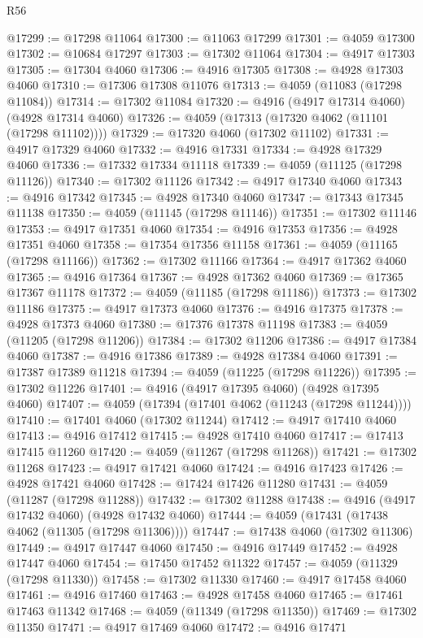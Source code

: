 \begin{lexlean}{R56}
\begin{coremodule}
@17299 := @17298 @11064
@17300 := @11063 @17299
@17301 := @4059 @17300
@17302 := @10684 @17297
@17303 := @17302 @11064
@17304 := @4917 @17303
@17305 := @17304 @4060
@17306 := @4916 @17305
@17308 := @4928 @17303 @4060
@17310 := @17306 @17308 @11076
@17313 := @4059 (@11083 (@17298 @11084))
@17314 := @17302 @11084
@17320 := @4916 (@4917 @17314 @4060) (@4928 @17314 @4060)
@17326 := @4059 (@17313 (@17320 @4062 (@11101 (@17298 @11102))))
@17329 := @17320 @4060 (@17302 @11102)
@17331 := @4917 @17329 @4060
@17332 := @4916 @17331
@17334 := @4928 @17329 @4060
@17336 := @17332 @17334 @11118
@17339 := @4059 (@11125 (@17298 @11126))
@17340 := @17302 @11126
@17342 := @4917 @17340 @4060
@17343 := @4916 @17342
@17345 := @4928 @17340 @4060
@17347 := @17343 @17345 @11138
@17350 := @4059 (@11145 (@17298 @11146))
@17351 := @17302 @11146
@17353 := @4917 @17351 @4060
@17354 := @4916 @17353
@17356 := @4928 @17351 @4060
@17358 := @17354 @17356 @11158
@17361 := @4059 (@11165 (@17298 @11166))
@17362 := @17302 @11166
@17364 := @4917 @17362 @4060
@17365 := @4916 @17364
@17367 := @4928 @17362 @4060
@17369 := @17365 @17367 @11178
@17372 := @4059 (@11185 (@17298 @11186))
@17373 := @17302 @11186
@17375 := @4917 @17373 @4060
@17376 := @4916 @17375
@17378 := @4928 @17373 @4060
@17380 := @17376 @17378 @11198
@17383 := @4059 (@11205 (@17298 @11206))
@17384 := @17302 @11206
@17386 := @4917 @17384 @4060
@17387 := @4916 @17386
@17389 := @4928 @17384 @4060
@17391 := @17387 @17389 @11218
@17394 := @4059 (@11225 (@17298 @11226))
@17395 := @17302 @11226
@17401 := @4916 (@4917 @17395 @4060) (@4928 @17395 @4060)
@17407 := @4059 (@17394 (@17401 @4062 (@11243 (@17298 @11244))))
@17410 := @17401 @4060 (@17302 @11244)
@17412 := @4917 @17410 @4060
@17413 := @4916 @17412
@17415 := @4928 @17410 @4060
@17417 := @17413 @17415 @11260
@17420 := @4059 (@11267 (@17298 @11268))
@17421 := @17302 @11268
@17423 := @4917 @17421 @4060
@17424 := @4916 @17423
@17426 := @4928 @17421 @4060
@17428 := @17424 @17426 @11280
@17431 := @4059 (@11287 (@17298 @11288))
@17432 := @17302 @11288
@17438 := @4916 (@4917 @17432 @4060) (@4928 @17432 @4060)
@17444 := @4059 (@17431 (@17438 @4062 (@11305 (@17298 @11306))))
@17447 := @17438 @4060 (@17302 @11306)
@17449 := @4917 @17447 @4060
@17450 := @4916 @17449
@17452 := @4928 @17447 @4060
@17454 := @17450 @17452 @11322
@17457 := @4059 (@11329 (@17298 @11330))
@17458 := @17302 @11330
@17460 := @4917 @17458 @4060
@17461 := @4916 @17460
@17463 := @4928 @17458 @4060
@17465 := @17461 @17463 @11342
@17468 := @4059 (@11349 (@17298 @11350))
@17469 := @17302 @11350
@17471 := @4917 @17469 @4060
@17472 := @4916 @17471

\end{coremodule}
\end{lexlean}
